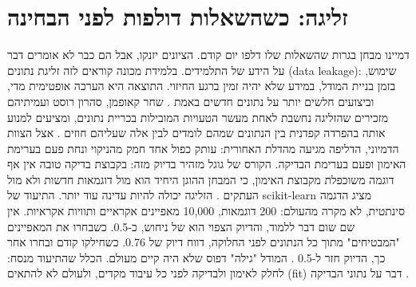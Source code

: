 \section{זליגה: כשהשאלות דולפות לפני הבחינה}
דמיינו מבחן בגרות שהשאלות שלו דלפו יום קודם. הציונים יזנקו, אבל הם כבר לא אומרים דבר על הידע של התלמידים. בלמידת מכונה קוראים לזה זליגת נתונים (data leakage): שימוש, בזמן בניית המודל, במידע שלא יהיה זמין ברגע החיזוי. התוצאה היא הערכה אופטימית מדי, וביצועים חלשים יותר על נתונים חדשים באמת \cite{S-ch02-08}. שחר קאופמן, סהרון רוסט ועמיתיהם מזכירים שהזליגה נחשבת לאחת מעשר הטעויות המובילות בכריית נתונים, ומציעים למנוע אותה בהפרדה קפדנית בין הנתונים שמהם לומדים לבין אלה שעליהם חוזים \cite{S-ch02-06}.
אצל הצוות הדמיוני, הדליפה מגיעה מהדלת האחורית: עותק כפול אחד חמק מהניקוי ונחת פעם בערימת האימון ופעם בערימת הבדיקה. הקורס של גוגל מזהיר בדיוק מזה: בקבוצת בדיקה טובה אין אף דוגמה משוכפלת מקבוצת האימון, כי המבחן ההוגן היחיד הוא מול דוגמאות חדשות ולא מול העתקים \cite{S-ch02-10}.
הזליגה יכולה להיות עדינה עוד יותר. התיעוד של scikit-learn מציג הדגמה סינתטית, לא מקרה מהעולם: 200 דוגמאות, 10,000 מאפיינים אקראיים ותוויות אקראיות. אין שם שום דבר ללמוד, והדיוק הצפוי הוא של ניחוש, כ-0.5. כשבחרו את המאפיינים "המבטיחים" מתוך כל הנתונים לפני החלוקה, דווח דיוק של 0.76. כשחילקו קודם ובחרו אחר כך, הדיוק חזר ל-0.5 \cite{S-ch02-08}. המודל "גילה" דפוס שלא היה קיים מעולם. הכלל שהתיעוד מנסח: לחלק לאימון ולבדיקה לפני כל עיבוד מקדים, ולעולם לא להתאים (fit) דבר על נתוני הבדיקה \cite{S-ch02-08}.
